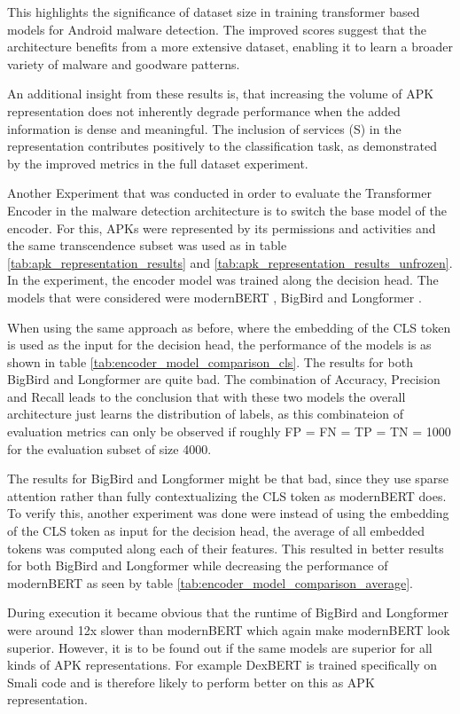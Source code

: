 This highlights the significance of dataset size in training 
transformer based models for Android malware detection. 
The improved scores suggest that the architecture benefits 
from a more extensive dataset, enabling it to learn a broader 
variety of malware and goodware patterns. 

An additional insight from these results is, that increasing 
the volume of APK representation does not inherently degrade 
performance when the added information is dense and meaningful. 
The inclusion of services (S) in the representation contributes 
positively to the classification task, as demonstrated by the 
improved metrics in the full dataset experiment.

Another Experiment that was conducted in order to evaluate the 
Transformer Encoder in the malware detection architecture is to switch
the base model of the encoder.
For this, APKs were represented by its permissions and activities
and the same transcendence subset was used as in table 
\ref{tab:apk_representation_results} and \ref{tab:apk_representation_results_unfrozen}.
In the experiment, the encoder model was trained along the decision head.
The models that were considered were modernBERT \cite{modernbert}, 
BigBird \cite{bigbird} and Longformer \cite{longformer}. 

When using the same approach as before, where the embedding of the CLS token is used
as the input for the decision head, the performance of the models is as shown in 
table \ref{tab:encoder_model_comparison_cls}. The results for both BigBird and 
Longformer are quite bad. The combination of Accuracy, Precision and Recall leads
to the conclusion that with these two models the overall architecture just learns the 
distribution of labels, as this combinateion of evaluation metrics can only be observed 
if roughly FP = FN = TP = TN = 1000 for the evaluation subset of size 4000.

The results for BigBird and Longformer might be that bad, since they use sparse attention
rather than fully contextualizing the CLS token as modernBERT does.
To verify this, another experiment was done were instead of 
using the embedding of the CLS token
as input for the decision head, the average of all embedded 
tokens was computed along each of their features.
This resulted in better results for both BigBird and Longformer 
while decreasing the performance of
modernBERT as seen by table \ref{tab:encoder_model_comparison_average}.

During execution it became obvious that the runtime of BigBird and Longformer were
around 12x slower than modernBERT which again make modernBERT look superior.
However, it is to be found out if the same models are superior for all kinds of
APK representations. For example DexBERT is trained specifically on Smali code
and is therefore likely to perform better on this as APK representation.

